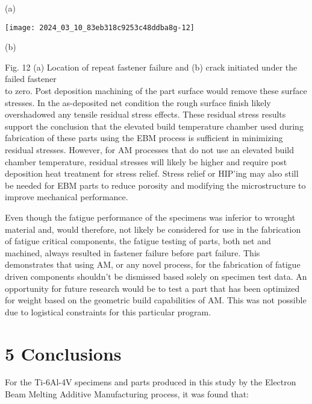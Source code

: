 \documentclass[10pt]{article}
\begin{document}
(a)

\begin{center}
\texttt{[image: 2024\_03\_10\_83eb318c9253c48ddba8g-12]}
\end{center}

(b)

Fig. 12 (a) Location of repeat fastener failure and (b) crack initiated under the failed fastener\\
to zero. Post deposition machining of the part surface would remove these surface stresses. In the as-deposited net condition the rough surface finish likely overshadowed any tensile residual stress effects. These residual stress results support the conclusion that the elevated build temperature chamber used during fabrication of these parts using the EBM process is sufficient in minimizing residual stresses. However, for AM processes that do not use an elevated build chamber temperature, residual stresses will likely be higher and require post deposition heat treatment for stress relief. Stress relief or HIP'ing may also still be needed for EBM parts to reduce porosity and modifying the microstructure to improve mechanical performance.

Even though the fatigue performance of the specimens was inferior to wrought material and, would therefore, not likely be considered for use in the fabrication of fatigue critical components, the fatigue testing of parts, both net and machined, always resulted in fastener failure before part failure. This demonstrates that using AM, or any novel process, for the fabrication of fatigue driven components shouldn't be dismissed based solely on specimen test data. An opportunity for future research would be to test a part that has been optimized for weight based on the geometric build capabilities of AM. This was not possible due to logistical constraints for this particular program.

\section*{5 Conclusions}
For the Ti-6Al-4V specimens and parts produced in this study by the Electron Beam Melting Additive Manufacturing process, it was found that:
\end{document}
